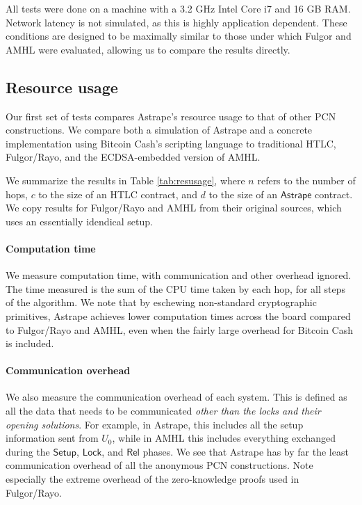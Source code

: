 \documentclass[USenglish,oneside,twocolumn]{article}
\begin{document}
All tests were done on a machine with a 3.2 GHz Intel Core i7 and 16 GB RAM. Network latency is not simulated, as this is highly application dependent. These conditions are designed to be maximally similar to those under which Fulgor \cite{malavolta2017concurrency} and AMHL \cite{malavolta2019anonymous} were evaluated, allowing us to compare the results directly.

\subsection{Resource usage}

Our first set of tests compares Astrape's resource usage to that of other PCN constructions. We compare both a simulation of Astrape and a concrete implementation using Bitcoin Cash's scripting language to traditional HTLC, Fulgor/Rayo, and the ECDSA-embedded version of AMHL.

We summarize the results in Table \ref{tab:resusage}, where $n$ refers to the number of hops, $c$ to the size of an HTLC contract, and $d$ to the size of an $\mathsf{Astrape}$ contract. We copy results for Fulgor/Rayo \cite{malavolta2017concurrency} and AMHL \cite{malavolta2019anonymous} from their original sources, which uses an essentially idendical setup.

\paragraph*{Computation time}

We measure computation time, with communication and other overhead ignored. The time measured is the sum of the CPU time taken by each hop, for all steps of the algorithm. We note that by eschewing non-standard cryptographic primitives, Astrape achieves lower computation times across the board compared to Fulgor/Rayo and AMHL, even when the fairly large overhead for Bitcoin Cash is included.

\paragraph*{Communication overhead}

We also measure the communication overhead of each system. This is defined as all the data that needs to be communicated \emph{other than the locks and their opening solutions}. For example, in Astrape, this includes all the setup information sent from $U_0$, while in AMHL this includes everything exchanged during the $\mathsf{Setup}$, $\mathsf{Lock}$, and $\mathsf{Rel}$ \cite{malavolta2019anonymous} phases. We see that Astrape has by far the least communication overhead of all the anonymous PCN constructions. Note especially the extreme overhead of the zero-knowledge proofs used in Fulgor/Rayo.
\end{document}
